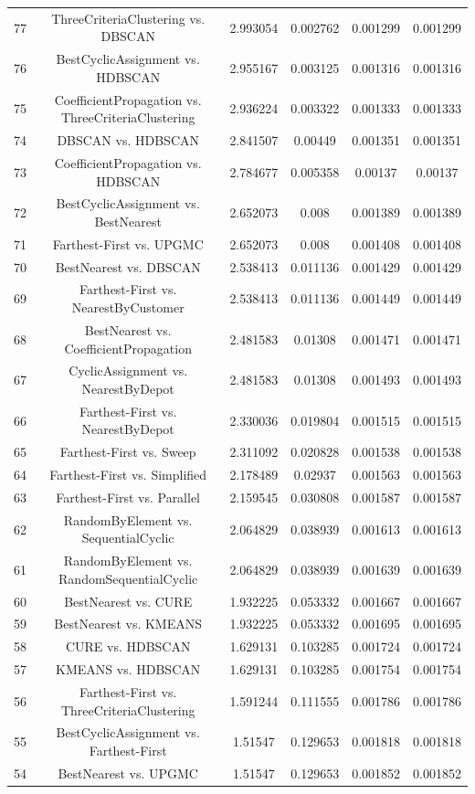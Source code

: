 \documentclass[a4paper,10pt]{article}
\begin{document}
\begin{landscape}
\begin{table}[!htp]
\begin{tabular}{cccccc}
77&ThreeCriteriaClustering vs. DBSCAN&2.993054&0.002762&0.001299&0.001299\\
76&BestCyclicAssignment vs. HDBSCAN&2.955167&0.003125&0.001316&0.001316\\
75&CoefficientPropagation vs. ThreeCriteriaClustering&2.936224&0.003322&0.001333&0.001333\\
74&DBSCAN vs. HDBSCAN&2.841507&0.00449&0.001351&0.001351\\
73&CoefficientPropagation vs. HDBSCAN&2.784677&0.005358&0.00137&0.00137\\
72&BestCyclicAssignment vs. BestNearest&2.652073&0.008&0.001389&0.001389\\
71&Farthest-First vs. UPGMC&2.652073&0.008&0.001408&0.001408\\
70&BestNearest vs. DBSCAN&2.538413&0.011136&0.001429&0.001429\\
69&Farthest-First vs. NearestByCustomer&2.538413&0.011136&0.001449&0.001449\\
68&BestNearest vs. CoefficientPropagation&2.481583&0.01308&0.001471&0.001471\\
67&CyclicAssignment vs. NearestByDepot&2.481583&0.01308&0.001493&0.001493\\
66&Farthest-First vs. NearestByDepot&2.330036&0.019804&0.001515&0.001515\\
65&Farthest-First vs. Sweep&2.311092&0.020828&0.001538&0.001538\\
64&Farthest-First vs. Simplified&2.178489&0.02937&0.001563&0.001563\\
63&Farthest-First vs. Parallel&2.159545&0.030808&0.001587&0.001587\\
62&RandomByElement vs. SequentialCyclic&2.064829&0.038939&0.001613&0.001613\\
61&RandomByElement vs. RandomSequentialCyclic&2.064829&0.038939&0.001639&0.001639\\
60&BestNearest vs. CURE&1.932225&0.053332&0.001667&0.001667\\
59&BestNearest vs. KMEANS&1.932225&0.053332&0.001695&0.001695\\
58&CURE vs. HDBSCAN&1.629131&0.103285&0.001724&0.001724\\
57&KMEANS vs. HDBSCAN&1.629131&0.103285&0.001754&0.001754\\
56&Farthest-First vs. ThreeCriteriaClustering&1.591244&0.111555&0.001786&0.001786\\
55&BestCyclicAssignment vs. Farthest-First&1.51547&0.129653&0.001818&0.001818\\
54&BestNearest vs. UPGMC&1.51547&0.129653&0.001852&0.001852\\

\end{tabular}
\end{table}
\end{landscape}
\end{document}
